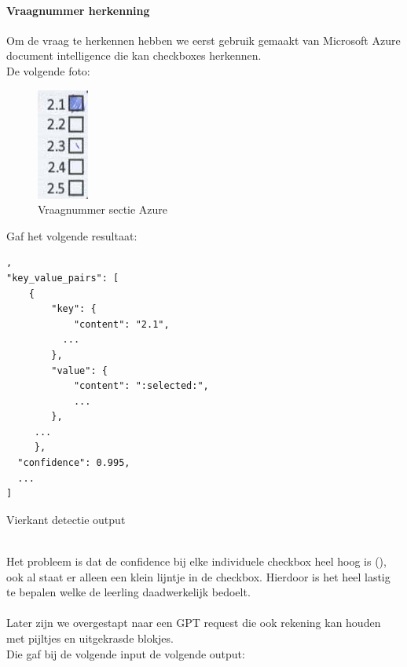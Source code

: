 \documentclass[12pt]{article}
\begin{document}
\begin{multicols}{2}
    
\paragraph*{Vraagnummer herkenning} Om de vraag te herkennen hebben we eerst gebruik gemaakt van Microsoft Azure document intelligence die kan checkboxes herkennen.\\
De volgende foto:
\begin{figure}[H]
    \centering
    \includegraphics[width=0.2\linewidth]{./images/methoden/inscannen/sectie/checkbox/vraagnummer/answer_section.png}
    \caption{Vraagnummer sectie Azure}
    \label{fig:enter-label}
\end{figure}
Gaf het volgende resultaat: 
\begin{listing}[H]
\begin{verbatim},
"key_value_pairs": [
    {
        "key": {
            "content": "2.1",
          ...
        },
        "value": {
            "content": ":selected:",
            ...
        },
     ...
     },
  "confidence": 0.995,
  ...
]
\end{verbatim}
\caption{Vierkant detectie output} 
\label{json-example}
\end{listing}\\ 
Het probleem is dat de confidence bij elke individuele checkbox heel hoog is (), ook al staat er alleen een klein lijntje in de checkbox. Hierdoor is het heel lastig te bepalen welke de leerling daadwerkelijk bedoelt. \\
\\
Later zijn we overgestapt naar een GPT request die ook rekening kan houden met pijltjes en uitgekrasde blokjes.\\
Die gaf bij de volgende input de volgende output:\\

\end{multicols}
\end{document}
